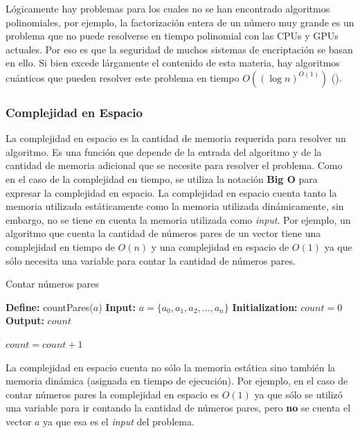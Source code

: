 Lógicamente hay problemas para los cuales no se han encontrado algoritmos polinomiales, por ejemplo, la factorización
entera de un número muy grande es un problema que no puede resolverse en tiempo polinomial con las CPUs y GPUs actuales.
Por eso es que la seguridad de muchos sistemas de encriptación se basan en ello. Si bien excede lárgamente el contenido
de esta materia, hay algoritmos cuánticos que pueden resolver este problema en tiempo $O((\log n)^{O(1)})$
(\cite{ekert1996}).

\subsubsection{Complejidad en Espacio}

La complejidad en espacio es la cantidad de memoria requerida para resolver un algoritmo. Es una función que depende de
la entrada del algoritmo y de la cantidad de memoria adicional que se necesite para resolver el problema. Como en el
caso de la complejidad en tiempo, se utiliza la notación \textbf{Big O} para expresar la complejidad en espacio.
La complejidad en espacio cuenta tanto la memoria utilizada estáticamente como la memoria utilizada dinámicamente, sin
embargo, no se tiene en cuenta la memoria utilizada como \textit{input}. Por ejemplo, un algoritmo que cuenta la
cantidad de números pares de un vector tiene una complejidad en tiempo de \textbf{$O(n)$} y una complejidad en espacio
de \textbf{$O(1)$} ya que sólo necesita una variable para contar la cantidad de números pares.


\begin{algorithm}
\caption{Contar números pares}
  \label{alg:countPares}
  \begin{algorithmic}[1]
    \Statex \textbf{Define:} countPares($a$)
    \Statex \textbf{Input:} $a = \{a_0, a_1, a_2, \ldots, a_n\}$
    \Statex \textbf{Initialization:} $count = 0$
    \State \textbf{Output:} $count$

        \State $count = count + 1$
      \EndIf
    \EndFor
  \end{algorithmic}
\end{algorithm}

La complejidad en espacio cuenta no sólo la memoria estática sino también la memoria dinámica (asignada en tiempo de
ejecución). Por ejemplo, en el caso de contar números pares la complejidad en espacio es $O(1)$ ya que sólo se utilizó
una variable para ir contando la cantidad de números pares, pero \textbf{no} se cuenta el vector $a$ ya que esa es el
\textit{input} del problema.

